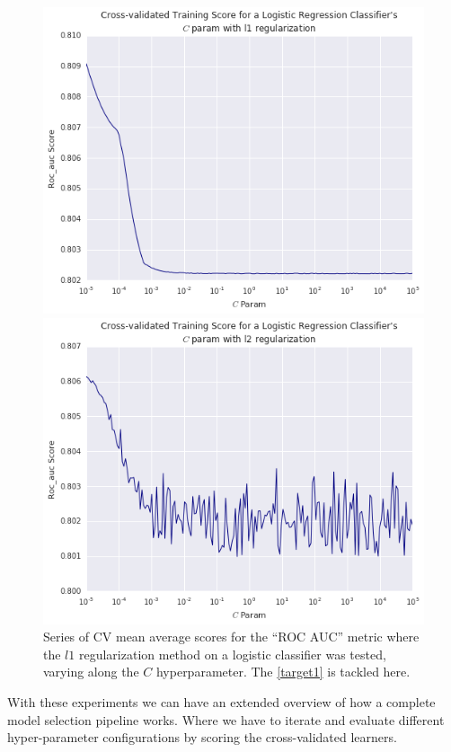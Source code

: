 \begin{figure}
\centering
\begin{minipage}{.5\textwidth}
  \includegraphics[width=.8\linewidth]{figures/cross_validation/logreg_cv_regularization_l1_rocauc_series}
\end{minipage}%
\begin{minipage}{.5\textwidth}
  \includegraphics[width=.8\linewidth]{figures/cross_validation/logreg_cv_regularization_l2_rocauc_series}
  \end{minipage}
\caption{Series of CV mean average scores for the ``ROC AUC'' metric where the $l1$ regularization method on a logistic classifier was tested, varying along the $C$ hyperparameter.
The \cref{target1} is tackled here.}\label{fig:rocauc_logreg_cv_regularized_comparison}
\end{figure}


With these experiments we can have an extended overview of how a complete model selection pipeline works. Where we have to iterate and evaluate different hyper-parameter configurations by scoring the cross-validated learners.	